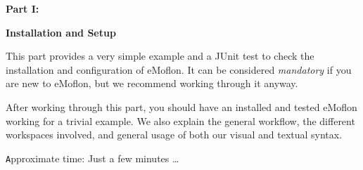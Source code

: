 
{\bf \huge Part I:}
\vspace{0.7cm}
 
{\bf \Huge Installation and Setup }

\vspace{0.5cm}

This part provides a very simple example and a JUnit test to check the installation and configuration of eMoflon. It can be considered \emph{mandatory} if you
are new to eMoflon, but we recommend working through it anyway.

After working through this part, you should have an installed and tested eMoflon working for a trivial example. We also explain the general workflow, the
different workspaces involved, and general usage of both our visual and textual syntax.

{\small \texttt Approximate time: Just a few minutes \ldots}









